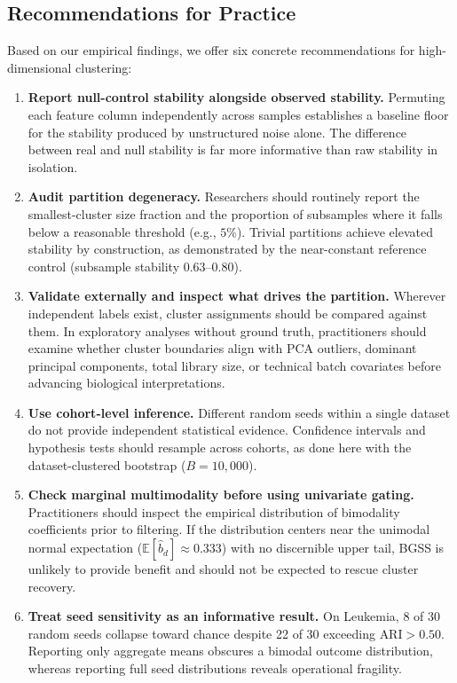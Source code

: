 \documentclass[pdflatex,sn-mathphys-num]{sn-jnl}
\theoremstyle{thmstyleone}
\theoremstyle{thmstyletwo}
\theoremstyle{thmstylethree}
\begin{document}
\subsection{Recommendations for Practice}\label{sec:disc_recommendations}
Based on our empirical findings, we offer six concrete recommendations for high-dimensional clustering:
\begin{enumerate}
    \item \textbf{Report null-control stability alongside observed stability.} Permuting each feature column independently across samples establishes a baseline floor for the stability produced by unstructured noise alone. The difference between real and null stability is far more informative than raw stability in isolation.
    \item \textbf{Audit partition degeneracy.} Researchers should routinely report the smallest-cluster size fraction and the proportion of subsamples where it falls below a reasonable threshold (e.g., $5\%$). Trivial partitions achieve elevated stability by construction, as demonstrated by the near-constant reference control (subsample stability $0.63\text{--}0.80$).
    \item \textbf{Validate externally and inspect what drives the partition.} Wherever independent labels exist, cluster assignments should be compared against them. In exploratory analyses without ground truth, practitioners should examine whether cluster boundaries align with PCA outliers, dominant principal components, total library size, or technical batch covariates before advancing biological interpretations.
    \item \textbf{Use cohort-level inference.} Different random seeds within a single dataset do not provide independent statistical evidence. Confidence intervals and hypothesis tests should resample across cohorts, as done here with the dataset-clustered bootstrap ($B = 10{,}000$).
    \item \textbf{Check marginal multimodality before using univariate gating.} Practitioners should inspect the empirical distribution of bimodality coefficients prior to filtering. If the distribution centers near the unimodal normal expectation ($\mathbb{E}[\hat{b}_d] \approx 0.333$) with no discernible upper tail, BGSS is unlikely to provide benefit and should not be expected to rescue cluster recovery.
    \item \textbf{Treat seed sensitivity as an informative result.} On Leukemia, 8 of 30 random seeds collapse toward chance despite 22 of 30 exceeding $\text{ARI} > 0.50$. Reporting only aggregate means obscures a bimodal outcome distribution, whereas reporting full seed distributions reveals operational fragility.
\end{enumerate}
\end{document}
